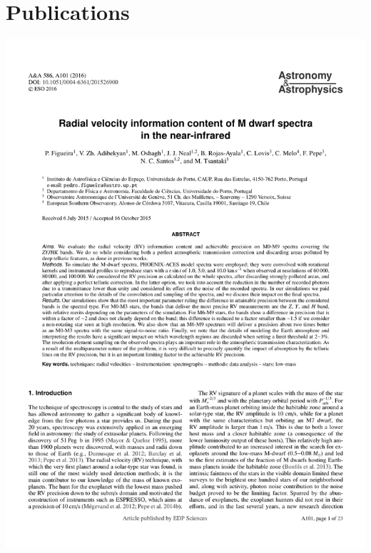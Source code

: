 \section{Publications}\label{app_sec:publications}
{\centering
    {\includegraphics[width=.9\textwidth, keepaspectratio=true, page = 1, trim = 1cm 1cm 1cm 1cm, clip = true]{appendices/papers/Figueira2016_grey.pdf}}

}
